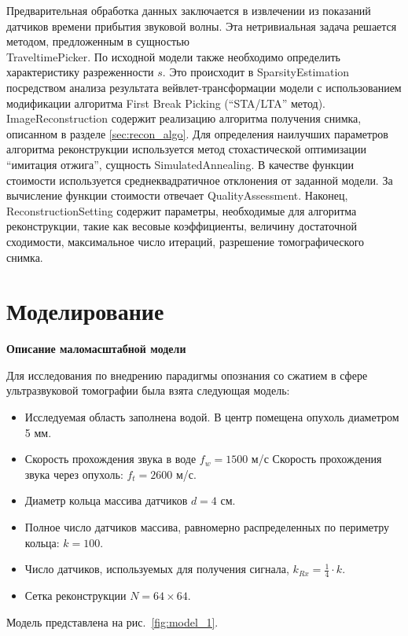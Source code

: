 \documentclass[14pt]{matmex-diploma-custom}
\begin{document}
Предварительная обработка данных заключается в извлечении из показаний датчиков времени прибытия звуковой волны. Эта нетривиальная задача решается методом, предложенным в \cite{li2009improved} сущностью \\ TraveltimePicker. По исходной модели также необходимо определить характеристику разреженности $s$. Это происходит в SparsityEstimation посредством анализа результата вейвлет-трансформации модели с использованием модификации алгоритма First Break Picking (``STA/LTA'' метод). ImageReconstruction содержит реализацию алгоритма получения снимка, описанном в разделе \ref{sec:recon_algo}. Для определения наилучших параметров алгоритма реконструкции используется метод стохастической оптимизации ``имитация отжига'', сущность SimulatedAnnealing. В качестве функции стоимости используется среднеквадратичное отклонения от заданной модели. За вычисление функции стоимости отвечает QualityAssessment. Наконец, ReconstructionSetting содержит параметры, необходимые для алгоритма реконструкции, такие как весовые коэффициенты, величину достаточной сходимости, максимальное число итераций, разрешение томографического снимка. 


\section{Моделирование} \label{sec:modeling}

\textbf{Описание маломасштабной модели} \label{sec:model_desc}

Для исследования по внедрению парадигмы опознания со сжатием в сфере ультразвуковой томографии была взята следующая модель:
\begin{itemize}
\item Исследуемая область заполнена водой. В центр помещена опухоль диаметром 5 мм.
\item Скорость прохождения звука в воде $f_w = 1500$ м/с Скорость прохождения звука через опухоль: $f_t = 2600$ м/с.
\item Диаметр кольца массива датчиков $d = 4 $ см.
\item Полное число датчиков массива, равномерно распределенных по периметру кольца: $k = 100$.
\item Число датчиков, используемых для получения сигнала, $k_{Rx} = \frac{1}{4} \cdot k$.
\item Сетка реконструкции $N = 64\times 64$.
\end{itemize}
Модель представлена на рис.~\ref{fig:model_1}.
\end{document}
